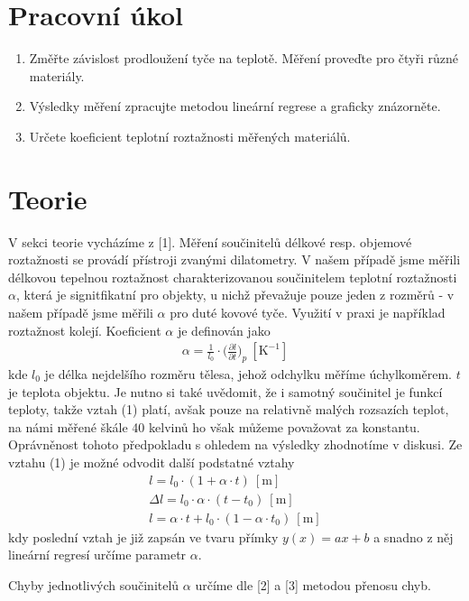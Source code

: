\documentclass{article}
\author{"Patrik Novotný"}
\begin{document}
\section*{Pracovní úkol}
\begin{enumerate}
\item Změřte závislost prodloužení tyče na teplotě. Měření proveďte pro čtyři různé materiály.
\item Výsledky měření zpracujte metodou lineární regrese a graficky znázorněte.
\item Určete koeficient teplotní roztažnosti měřených materiálů.
\end{enumerate}
\section*{Teorie}
\par V sekci teorie vycházíme z [1]. Měření součinitelů délkové resp. objemové roztažnosti se provádí přístroji zvanými dilatometry. V našem případě jsme měřili délkovou tepelnou roztažnost charakterizovanou součinitelem teplotní roztažnosti $\alpha$, která je signitfikatní pro objekty, u nichž převažuje pouze jeden z rozměrů - v našem případě jsme měřili $\alpha$ pro duté kovové tyče. Využití v praxi je například roztažnost kolejí. Koeficient $\alpha$ je definován jako
\begin{align}
\alpha = \frac{1}{l_{0}} \cdot \Bigg( \frac{\partial l}{\partial t} \Bigg)_{p} \: \mathrm{[K^{-1}]}
\end{align}
kde $l_{0}$ je délka nejdelšího rozměru tělesa, jehož odchylku měříme úchylkoměrem. $t$ je teplota objektu. Je nutno si také uvědomit, že i samotný součinitel je funkcí teploty, takže vztah (1) platí, avšak pouze na relativně malých rozsazích teplot, na námi měřené škále 40 kelvinů ho však můžeme považovat za konstantu. Oprávněnost tohoto předpokladu s ohledem na výsledky zhodnotíme v diskusi. Ze vztahu (1) je možné odvodit další podstatné vztahy
\begin{align}
l = l_{0} \cdot ( 1 + \alpha \cdot t) \: \mathrm{[m]} \\
\Delta l = l_{0} \cdot \alpha \cdot (t-t_{0}) \: \mathrm{[m]} \\
l = \alpha \cdot t + l_{0} \cdot (1 - \alpha \cdot t_{0}) \: \mathrm{[m]}
\end{align}
kdy poslední vztah je již zapsán ve tvaru přímky $y(x) = ax + b$ a snadno z něj lineární regresí určíme parametr $\alpha$.
\par Chyby jednotlivých součinitelů $\alpha$ určíme dle [2] a [3] metodou přenosu chyb.
\end{document}
